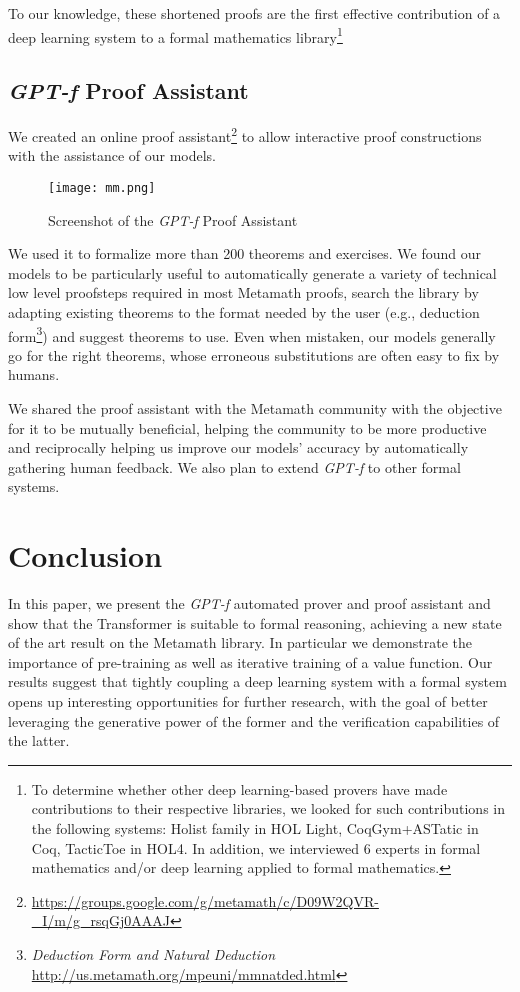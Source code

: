 \documentclass{article}
\begin{document}
To our knowledge, these shortened proofs are the first effective contribution of a deep learning system to a formal mathematics library\footnote{To determine whether other deep learning-based provers have made contributions to their respective libraries, we looked for such contributions in the following systems: Holist family in HOL Light, CoqGym+ASTatic in Coq, TacticToe in HOL4. In addition, we interviewed 6 experts in formal mathematics and/or deep learning applied to formal mathematics.}

\subsection{\textit{GPT-f} Proof Assistant}
\label{section:gptfproofassistant}

We created an online proof assistant\footnote{\url{https://groups.google.com/g/metamath/c/D09W2QVR-_I/m/g_rsqGj0AAAJ}} to allow interactive proof constructions with the assistance of our models.

\begin{figure}
    \texttt{[image: mm.png]}
    \caption{Screenshot of the \textit{GPT-f} Proof Assistant}
    \label{fig:mm}
\end{figure}

We used it to formalize more than 200 theorems and exercises. We found our models to be particularly useful to automatically generate a variety of technical low level proofsteps required in most Metamath proofs, search the library by adapting existing theorems to the format needed by the user (e.g., deduction form\footnote{\textit{Deduction Form and Natural Deduction} \url{http://us.metamath.org/mpeuni/mmnatded.html}}) and suggest theorems to use. Even when mistaken, our models generally go for the right theorems, whose erroneous substitutions are often easy to fix by humans.

We shared the proof assistant with the Metamath community with the objective for it to be mutually beneficial, helping the community to be more productive and reciprocally helping us improve our models' accuracy by automatically gathering human feedback. We also plan to extend \textit{GPT-f} to other formal systems.

\section{Conclusion}

In this paper, we present the \textit{GPT-f} automated prover and proof assistant and show that the Transformer is suitable to formal reasoning, achieving a new state of the art result on the Metamath library. In particular we demonstrate the importance of pre-training as well as iterative training of a value function. Our results suggest that tightly coupling a deep learning system with a formal system opens up interesting opportunities for further research, with the goal of better leveraging the generative power of the former and the verification capabilities of the latter.
\end{document}
